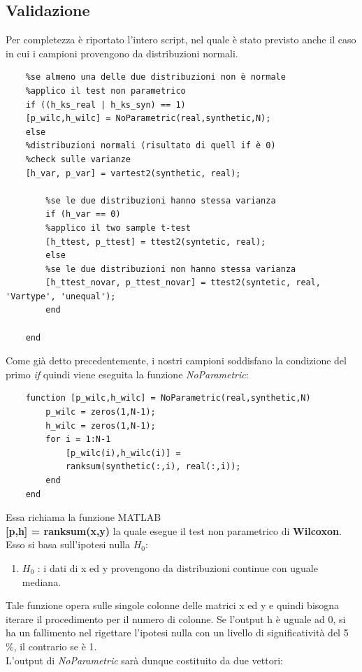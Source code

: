 \subsection{Validazione}
Per completezza è riportato l'intero script, nel quale è stato previsto anche il caso in cui i campioni provengono da distribuzioni normali.
\\
\begin{verbatim}
	%se almeno una delle due distribuzioni non è normale
	%applico il test non parametrico
	if ((h_ks_real | h_ks_syn) == 1)   
	[p_wilc,h_wilc] = NoParametric(real,synthetic,N);
	else
	%distribuzioni normali (risultato di quell if è 0)
	%check sulle varianze
	[h_var, p_var] = vartest2(synthetic, real);
	
		%se le due distribuzioni hanno stessa varianza
		if (h_var == 0)
		%applico il two sample t-test
		[h_ttest, p_ttest] = ttest2(syntetic, real);
		else
		%se le due distribuzioni non hanno stessa varianza
		[h_ttest_novar, p_ttest_novar] = ttest2(syntetic, real, 'Vartype', 'unequal');
		end
	
	end
\end{verbatim}
Come già detto precedentemente, i nostri campioni soddisfano la condizione del primo \textit{if} quindi viene eseguita la funzione \textit{NoParametric}:
\begin{verbatim}
	function [p_wilc,h_wilc] = NoParametric(real,synthetic,N)
		p_wilc = zeros(1,N-1);
		h_wilc = zeros(1,N-1);
		for i = 1:N-1
			[p_wilc(i),h_wilc(i)] = 
			ranksum(synthetic(:,i), real(:,i));
		end
	end
\end{verbatim}
Essa richiama la funzione MATLAB 
\\
\textbf{[p,h] = ranksum(x,y)}
la quale esegue il test non parametrico di \textbf{Wilcoxon}. Esso si basa sull'ipotesi nulla $H_0$:
\begin{enumerate}
	\item $H_0$ : i dati di x ed y provengono da distribuzioni continue con uguale mediana. 
\end{enumerate}
Tale funzione opera sulle singole colonne delle matrici x ed y e quindi bisogna iterare il procedimento per il numero di colonne.
Se l'output h è uguale ad 0, si ha un fallimento nel rigettare l'ipotesi nulla con un livello di significatività del 5 \%, il contrario se è 1.
\\
L'output di \textit{NoParametric} sarà dunque costituito da due vettori:
